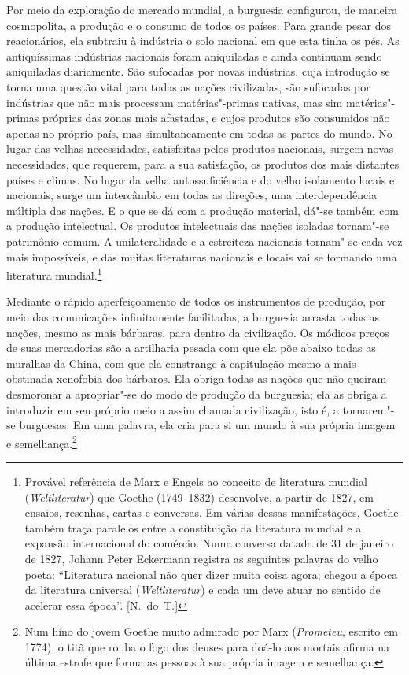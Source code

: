 Por meio da exploração do mercado mundial, a burguesia       \label{5}
configurou, de maneira cosmopolita, a produção e o consumo de todos os
países. Para grande pesar dos reacionários, ela subtraiu à indústria o
solo nacional em que esta tinha os pés. As antiquíssimas indústrias
nacionais foram aniquiladas e ainda continuam sendo aniquiladas
diariamente. São sufocadas por novas indústrias, cuja introdução se
torna uma questão vital para todas as nações civilizadas, são sufocadas
por indústrias que não mais processam matérias"-primas nativas, mas
sim matérias"-primas próprias das zonas mais afastadas, e cujos
produtos são consumidos não apenas no próprio país, mas simultaneamente
em todas as partes do mundo. No lugar das velhas necessidades,
satisfeitas pelos produtos nacionais, surgem novas necessidades, que
requerem, para a sua satisfação, os produtos dos mais distantes
países e climas. No lugar da velha autossuficiência e do velho
isolamento locais e nacionais, surge um intercâmbio em todas as
direções, uma interdependência múltipla das nações. E o que se dá com a
produção material, dá"-se também com a produção intelectual. Os
produtos intelectuais das nações isoladas tornam"-se patrimônio comum.
A unilateralidade e a estreiteza nacionais tornam"-se cada vez mais
impossíveis, e das muitas literaturas nacionais e locais vai se
formando uma literatura
mundial.\footnote{ Provável referência de Marx e 
Engels ao conceito de literatura mundial (\textit{Weltliteratur}) que
Goethe (1749--1832) desenvolve, a partir de 1827, em ensaios,
resenhas, cartas e conversas. Em várias dessas manifestações, Goethe
também traça paralelos entre a constituição da literatura mundial e a
expansão internacional do comércio. Numa conversa datada de 31 de
janeiro de 1827, Johann Peter Eckermann registra as seguintes palavras
do velho poeta: “Literatura nacional não quer dizer muita coisa agora;
chegou a época da literatura universal (\textit{Weltliteratur}) e cada
um deve atuar no sentido de acelerar essa época”.  [N.~do~T.]}

Mediante o rápido aperfeiçoamento de todos os instrumentos de produção,
por meio das comunicações infinitamente facilitadas, a burguesia
arrasta todas as nações, mesmo as mais bárbaras, para dentro da
civilização. Os módicos preços de suas mercadorias são a artilharia
pesada com que ela põe abaixo todas as muralhas da China, com que ela
constrange à capitulação mesmo a mais obstinada xenofobia dos bárbaros.
Ela obriga todas as nações que não queiram desmoronar a apropriar"-se
do modo de produção da burguesia; ela as obriga a introduzir em seu
próprio meio a assim chamada civilização, isto é, a tornarem"-se
burguesas. Em uma palavra, ela cria para si um mundo à sua própria
imagem e semelhança.\footnote{Num hino do jovem Goethe muito admirado por Marx (\textit{Prometeu}, escrito em 1774), o titã que rouba o fogo dos deuses para doá-lo aos mortais afirma na última estrofe que forma as pessoas à sua própria imagem e semelhança.}

